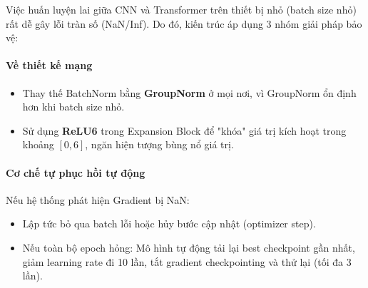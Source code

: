 \documentclass[conference]{IEEEtran}
\begin{document}
Việc huấn luyện lai giữa CNN và Transformer trên thiết bị nhỏ (batch size nhỏ) rất dễ gây lỗi tràn số (NaN/Inf). Do đó, kiến trúc áp dụng 3 nhóm giải pháp bảo vệ:

\paragraph{Về thiết kế mạng}
\begin{itemize}
    \item Thay thế BatchNorm bằng \textbf{GroupNorm} ở mọi nơi, vì GroupNorm ổn định hơn khi batch size nhỏ.
    \item Sử dụng \textbf{ReLU6} trong Expansion Block để "khóa" giá trị kích hoạt trong khoảng $[0, 6]$, ngăn hiện tượng bùng nổ giá trị.
\end{itemize}

\paragraph{Cơ chế tự phục hồi tự động}
Nếu hệ thống phát hiện Gradient bị NaN:
\begin{itemize}
    \item Lập tức bỏ qua batch lỗi hoặc hủy bước cập nhật (optimizer step).
    \item Nếu toàn bộ epoch hỏng: Mô hình tự động tải lại best checkpoint gần nhất, giảm learning rate đi 10 lần, tắt gradient checkpointing và thử lại (tối đa 3 lần).
\end{itemize}

\begin{table}[t]
\centering
\caption{Tổng hợp thông số các biến thể Mobile-U-ViT}
\label{tab:variants}
\end{table}
\end{document}
